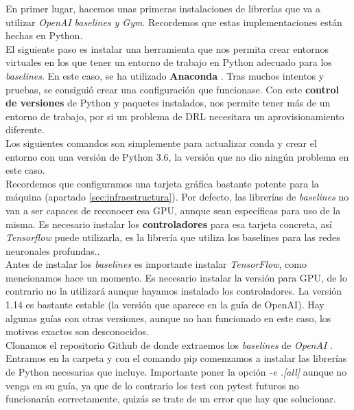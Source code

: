 \documentclass[11pt,fleqn]{book} %
\begin{document}
En primer lugar, hacemos unas primeras instalaciones de librerías que va a utilizar \textit{OpenAI baselines y Gym}. Recordemos que estas implementaciones están hechas en Python. \\

El siguiente paso es instalar una herramienta que nos permita crear entornos virtuales en los que tener un entorno de trabajo en Python adecuado para los \textit{baselines}. En este caso, se ha utilizado \textbf{Anaconda} \cite{article:anaconda}. Tras muchos intentos y pruebas, se consiguió crear una configuración que funcionase. Con este \textbf{control de versiones} de Python y paquetes instalados, nos permite tener más de un entorno de trabajo, por si un problema de DRL necesitara un aprovisionamiento diferente. \\

Los siguientes comandos son simplemente para actualizar conda y crear el entorno con una versión de Python 3.6, la versión que no dio ningún problema en este caso. \\

Recordemos que configuramos una tarjeta gráfica bastante potente para la máquina (apartado \ref{sec:infraestructura}). Por defecto, las librerías de \textit{baselines} no van a ser capaces de reconocer esa GPU, aunque sean específicas para uso de la misma. Es necesario instalar los \textbf{controladores} para esa tarjeta concreta, así \textit{Tensorflow} puede utilizarla, es la librería que utiliza los baselines para las redes neuronales profundas.\cite{article:tensorflow}.\\

Antes de instalar los \textit{baselines} es importante instalar \textit{TensorFlow}, como mencionamos hace un momento. Es necesario instalar la versión para GPU, de lo contrario no la utilizará aunque hayamos instalado los controladores. La versión 1.14 es bastante estable (la versión que aparece en la guía de OpenAI\cite{article:baselines}). Hay algunas guías con otras versiones, aunque no han funcionado en este caso, los motivos exactos son desconocidos. \\

Clonamos el repositorio Github de donde extraemos los \textit{baselines} de \textit{OpenAI} \cite{article:baselines}. Entramos en la carpeta y con el comando pip comenzamos a instalar las librerías de Python necesarias que incluye. Importante poner la opción \textit{-e .[all]} aunque no venga en su guía, ya que de lo contrario los test con pytest futuros no funcionarán correctamente, quizás se trate de un error que hay que solucionar. \\
\end{document}
